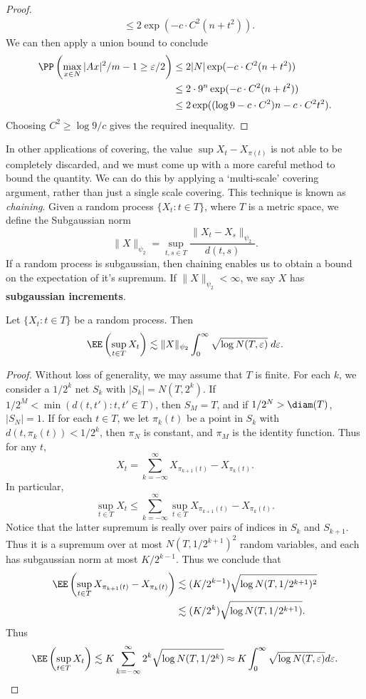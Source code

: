 \begin{proof}
\begin{align*}
        &\leq 2 \exp(-c \cdot C^2 (n + t^2)).
    \end{align*}
    We can then apply a union bound to conclude
    \begin{align*}
    	\PP \left( \max_{x \in N} |Ax|^2/m - 1 \geq \varepsilon/2 \right) &\leq 2 |N| \exp(-c \cdot C^2 (n + t^2))\\
    	&\leq 2 \cdot 9^n \exp(-c \cdot C^2 (n + t^2))\\
    	&\leq 2 \exp((\log 9 - c \cdot C^2) n - c \cdot C^2 t^2).
    \end{align*}
    Choosing $C^2 \geq \log 9 / c$ gives the required inequality.
\end{proof}

In other applications of covering, the value $\sup X_t - X_{\pi(t)}$ is not able to be completely discarded, and we must come up with a more careful method to bound the quantity. We can do this by applying a `multi-scale' covering argument, rather than just a single scale covering. This technique is known as \emph{chaining}. Given a random process $\{ X_t : t \in T \}$, where $T$ is a metric space, we define the Subgaussian norm
%
\[ \| X \|_{\psi_2} = \sup_{t,s \in T} \frac{\| X_t - X_s \|_{\psi_2}}{d(t,s)}. \]
%
If a random process is subgaussian, then chaining enables us to obtain a bound on the expectation of it's supremum. If $\| X \|_{\psi_2} < \infty$, we say $X$ has \textbf{subgaussian increments}.

\begin{theorem}
	Let $\{ X_t : t \in T \}$ be a random process. Then
	\[ \EE \left( \sup_{t \in T} X_t \right) \lesssim \| X \|_{\psi_2} \int_0^\infty \sqrt{\log N(T,\varepsilon)}\; d\varepsilon. \]
\end{theorem}
\begin{proof}
	Without loss of generality, we may assume that $T$ is finite. For each $k$, we consider a $1/2^k$ net $S_k$ with $|S_k| = N(T,2^k)$. If $1/2^M < \min(d(t,t'): t,t' \in T)$, then $S_M = T$, and if $1/2^N > \diam(T)$, $|S_N| = 1$. If for each $t \in T$, we let $\pi_k(t)$ be a point in $S_k$ with $d(t,\pi_k(t)) < 1/2^k$, then $\pi_N$ is constant, and $\pi_M$ is the identity function. Thus for any $t$,
	\[ X_t = \sum_{k = -\infty}^\infty X_{\pi_{k+1}(t)} - X_{\pi_k(t)}. \]
	In particular,
	\[ \sup_{t \in T} X_t \leq \sum_{k = -\infty}^\infty \sup_{t \in T} X_{\pi_{k+1}(t)} - X_{\pi_k(t)}. \]
	Notice that the latter supremum is really over pairs of indices in $S_k$ and $S_{k+1}$. Thus it is a supremum over at most $N(T,1/2^{k+1})^2$ random variables, and each has subgaussian norm at most $K/2^{k-1}$. Thus we conclude that
	\begin{align*}
		\EE \left( \sup_{t \in T} X_{\pi_{k+1}(t)} - X_{\pi_k(t)} \right) &\lesssim (K/2^{k-1}) \sqrt{\log N(T,1/2^{k+1})^2}\\
		&\lesssim (K/2^k) \sqrt{\log N(T,1/2^{k+1})}.
	\end{align*}
	Thus
	\[ \EE \left( \sup_{t \in T} X_t \right) \lesssim K \sum_{k = -\infty}^\infty 2^k \sqrt{\log N(T,1/2^k)} \approx K \int_0^\infty \sqrt{\log N(T,\varepsilon)} d\varepsilon. \qedhere  \]
\end{proof}

